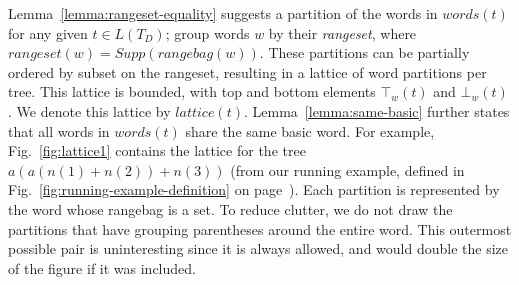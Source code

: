 \documentclass[acmsmall,review,anonymous]{acmart}\settopmatter{printfolios=true,printccs=false,printacmref=false}
\newcommand{\support}{\mathit{Supp}}
\newcommand{\words}{\mathit{words}} %
\newcommand{\alt}{\mathit{alt}} %
\newcommand{\rangebag}{\mathit{rangebag}} %
\newcommand{\rangeset}{\mathit{rangeset}} %
\newcommand{\altset}{\mathit{altset}} %
\newcommand{\lattice}{\mathit{lattice}} %
\newcommand{\topw}{\top_w} %
\newcommand{\botw}{\bot_w} %
\begin{document}
Lemma~\ref{lemma:rangeset-equality} suggests a partition of the words in $\words(t)$ for any given $t \in L(T_D)$; group words $w$ by their \emph{rangeset}, where $\rangeset(w) = \support(\rangebag(w))$. These partitions can be partially ordered by subset on the rangeset, resulting in a lattice of word partitions per tree. This lattice is bounded, with top and bottom elements $\topw(t)$ and $\botw(t)$. We denote this lattice by $\lattice(t)$. Lemma~\ref{lemma:same-basic} further states that all words in $\words(t)$ share the same basic word. For example, Fig.~\ref{fig:lattice1} contains the lattice for the tree $a(a(n(1)+n(2))+n(3))$ (from our running example, defined in Fig.~\ref{fig:running-example-definition} on page~\pageref{fig:running-example-definition}). Each partition is represented by the word whose rangebag is a set. To reduce clutter, we do not draw the partitions that have grouping parentheses around the entire word. This outermost possible pair is uninteresting since it is always allowed, and would double the size of the figure if it was included.
\end{document}
